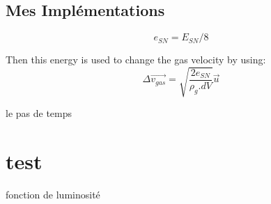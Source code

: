 \subsection{Mes Implémentations}

\begin{equation}
e_{SN} = E_{SN}/8
\end{equation}

Then this energy is used to change the gas velocity by using:
\begin{equation}
    \Delta \overrightarrow{v_{gas}} = \sqrt{\frac{2e_{SN}}{\rho_g.dV}} \overrightarrow{u}
    \label{eq_sn_direct}
\end{equation}

le pas de temps\\
\section{test}
fonction de luminosité 
